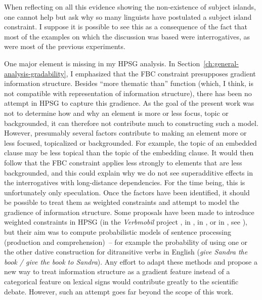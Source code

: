 When reflecting on all this evidence showing the non-existence of subject islands, one cannot help but ask why so many linguists have postulated a subject island constraint. I suppose it is possible to see this as a consequence of the fact that most of the examples on which the discussion was based were interrogatives, as were most of the previous experiments.

One major element is missing in my HPSG analysis. In Section~\ref{ch:general-analysis-gradability}, I emphasized that the FBC constraint presupposes gradient information structure. Besides  ``more thematic than'' function (which, I think, is not compatible with  representation of information structure), there has been no attempt in HPSG to capture this gradience. As the goal of the present work was not to determine how and why an element is more or less focus, topic or backgrounded, it can therefore not contribute much to constructing such a model. However, presumably several factors contribute to making an element more or less focused, topicalized or backgrounded. For example, the topic of an embedded clause may be less topical than the topic of the embedding clause. It would then follow that the FBC constraint applies less strongly to elements that are less backgrounded, and this could explain why we do not see superadditive effects in the interrogatives with long-distance dependencies. For the time being, this is unfortunately only speculation. Once the factors have been identified, it should be possible to treat them as weighted constraints and attempt to model the gradience of information structure. Some proposals have been made to introduce weighted constraints in HPSG (in the \emph{Verbmobil} project \citep{Mueller.S.2000}, in \citet{Brew.1995}, in \citet{Guzman.2015}, or in \citet{An.2020}, see \citet[164]{Mueller.S.2017}), but their aim was to compute probabilistic models of sentence processing (production and comprehension)~-- for example the probability of using one or the other dative construction for ditransitive verbs in English (\emph{give Sandra the book / give the book to Sandra}). Any effort to adapt these methods and propose a new way to treat information structure as a gradient feature instead of a categorical feature on lexical signs would contribute greatly to the scientific debate. However, such an attempt goes far beyond the scope of this work.


